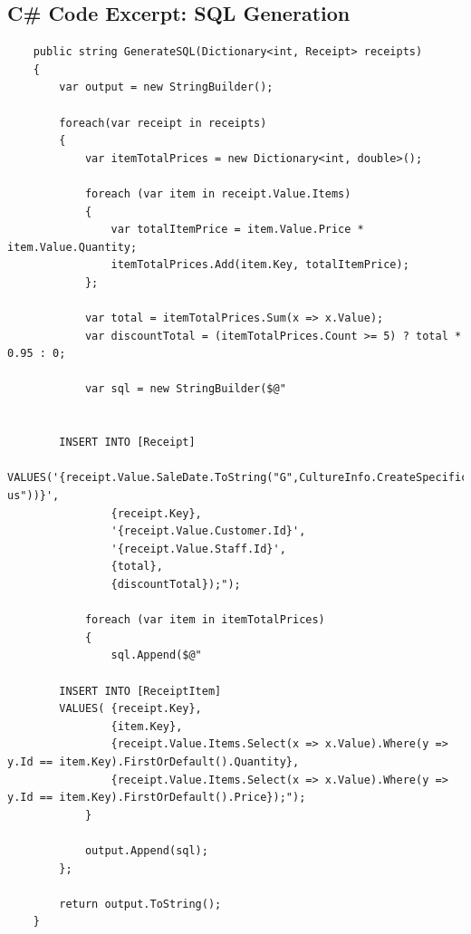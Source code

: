 \documentclass{article}
\begin{document}
\newpage

    \subsection{C\# Code Excerpt: SQL Generation}
    \label{sec:sharpcsqlgeneration}
    \begin{lstlisting}
    public string GenerateSQL(Dictionary<int, Receipt> receipts)
    {
        var output = new StringBuilder();

        foreach(var receipt in receipts)
        {
            var itemTotalPrices = new Dictionary<int, double>();

            foreach (var item in receipt.Value.Items)
            {
                var totalItemPrice = item.Value.Price * item.Value.Quantity;
                itemTotalPrices.Add(item.Key, totalItemPrice);
            };

            var total = itemTotalPrices.Sum(x => x.Value);
            var discountTotal = (itemTotalPrices.Count >= 5) ? total * 0.95 : 0;

            var sql = new StringBuilder($@"


        INSERT INTO [Receipt] 
        VALUES('{receipt.Value.SaleDate.ToString("G",CultureInfo.CreateSpecificCulture("en-us"))}',
                {receipt.Key},
                '{receipt.Value.Customer.Id}',
                '{receipt.Value.Staff.Id}',
                {total},
                {discountTotal});");

            foreach (var item in itemTotalPrices)
            {
                sql.Append($@"

        INSERT INTO [ReceiptItem]
        VALUES( {receipt.Key},
                {item.Key},
                {receipt.Value.Items.Select(x => x.Value).Where(y => y.Id == item.Key).FirstOrDefault().Quantity},
                {receipt.Value.Items.Select(x => x.Value).Where(y => y.Id == item.Key).FirstOrDefault().Price});");
            }

            output.Append(sql);
        };

        return output.ToString();
    }
    \end{lstlisting}
    
    
\end{document}
